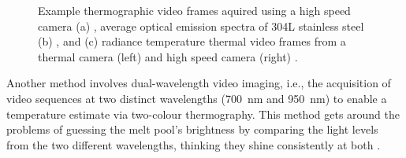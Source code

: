 \begin{figure}
    \centering
    \qquad
    \qquad
    \caption[Level 3 measurement methods.]{Example thermographic video frames aquired using a high speed camera (a) \cite{zhirnov_accurate_2020}, average optical emission spectra of 304L stainless steel (b) \cite{lough_-situ_2020}, and (c) radiance temperature thermal video frames from a thermal camera (left) and high speed camera (right) \cite{lane_measurements_2020}.}
\end{figure}
Another method involves dual-wavelength video imaging, i.e., the acquisition of video sequences at two distinct wavelengths (\SI{700}{\nano\metre} and \SI{950}{\nano\metre}) to enable a temperature estimate via two-colour thermography. This method gets around the problems of guessing the melt pool's brightness by comparing the light levels from the two different wavelengths, thinking they shine consistently at both \cite{williams_situ_2019}.

